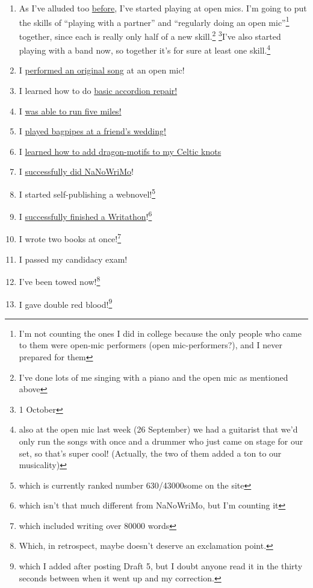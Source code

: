 \documentclass[12pt]{article}[titlepage]
\newcommand{\say}[1]{``#1''}
\newcommand{\1}{\={a}}
\newcommand{\2}{\={e}}
\newcommand{\3}{\={\i}}
\newcommand{\4}{\=o}
\newcommand{\5}{\=u}
\newcommand{\6}{\={A}}
\renewcommand{\,}{\textsuperscript{,}}
\begin{document}
\begin{enumerate}
\item As I've alluded too \href{open-mic-2.html}{before}, I've started playing at open mics.
I'm going to put the skills of \say{playing with a partner} and \say{regularly doing an open mic}\footnote{I'm not counting the ones I did in college because the only people who came to them were open-mic performers (open mic-performers?), and I never prepared for them} together, since each is really only half of a new skill.\footnote{I've done lots of me singing with a piano and the open mic as mentioned above} \footnote{1 October}I've also started playing with a band now, so together it's for sure at least one skill.\footnote{also at the open mic last week (26 September) we had a guitarist that we'd only run the songs with once and a drummer who just came on stage for our set, so that's super cool! (Actually, the two of them added a ton to our musicality)}
\item I \href{performing-a-song.html}{performed an original song} at an open mic!
\item I learned how to do \href{accordion-repair.html}{basic accordion repair!}
\item I \href{running-2.html}{was able to run five miles!} 
\item I \href{bagpipes.html}{played bagpipes at a friend's wedding!}
\item I \href{celtic-knots.html}{learned how to add dragon-motifs to my Celtic knots}
\item I \href{nanowrimo-4.html}{successfully did NaNoWriMo}!
\item I started self-publishing a webnovel!\footnote{which is currently ranked number 630/43000some on the site}
\item I \href{writathon-23-april.html}{successfully finished a Writathon}!\footnote{which isn't that much different from NaNoWriMo, but I'm counting it}
\item I wrote two books at once!\footnote{which included writing over 80000 words}
\item I passed my candidacy exam!
\item I've been towed now!\footnote{Which, in retrospect, maybe doesn't deserve an exclamation point.}
\item I gave double red blood!\footnote{which I added after posting Draft 5, but I doubt anyone read it in the thirty seconds between when it went up and my correction.}
\end{enumerate}
\end{document}
